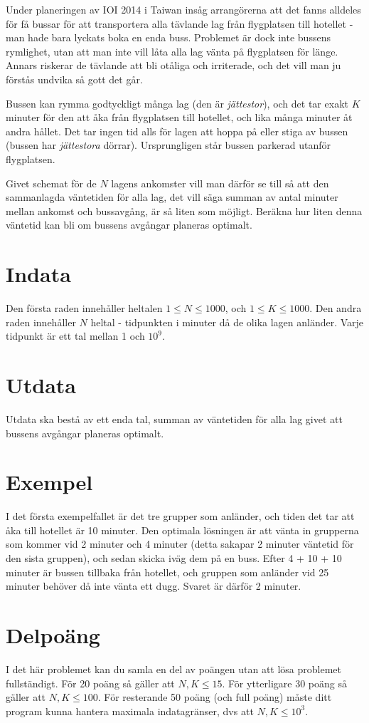 
Under planeringen av IOI 2014 i Taiwan insåg arrangörerna att det fanns alldeles för få bussar för att transportera alla tävlande lag från flygplatsen till hotellet - man hade bara lyckats boka en enda buss. Problemet är dock inte bussens rymlighet, utan att man inte vill låta alla lag vänta på flygplatsen för länge. Annars riskerar de tävlande att bli otåliga och irriterade, och det vill man ju förstås undvika så gott det går.

Bussen kan rymma godtyckligt många lag (den är \emph{jättestor}), och det tar exakt $K$ minuter för den att åka från flygplatsen till hotellet, och lika många minuter åt andra hållet. Det tar ingen tid alls för lagen att hoppa på eller stiga av bussen (bussen har \emph{jättestora} dörrar). Ursprungligen står bussen parkerad utanför flygplatsen.

Givet schemat för de $N$ lagens ankomster vill man därför se till så att den sammanlagda väntetiden för alla lag, det vill säga summan av antal minuter mellan ankomst och bussavgång, är så liten som möjligt. Beräkna hur liten denna väntetid kan bli om bussens avgångar planeras optimalt.

\section*{Indata}
Den första raden innehåller heltalen $1 \leq N \leq 1 000$, och $1 \leq K \leq 1000$.
Den andra raden innehåller $N$ heltal - tidpunkten i minuter då de olika lagen anländer. Varje tidpunkt är ett tal mellan 1 och $10^9$.

\section*{Utdata}
Utdata ska bestå av ett enda tal, summan av väntetiden för alla lag givet att bussens avgångar planeras optimalt.

\section*{Exempel}
I det första exempelfallet är det tre grupper som anländer, och tiden det tar att åka till hotellet är 10 minuter. Den optimala lösningen är att vänta in grupperna som kommer vid 2 minuter och 4 minuter (detta sakapar 2 minuter väntetid för den sista gruppen), och sedan skicka iväg dem på en buss. Efter 4 + 10 + 10 minuter är bussen tillbaka från hotellet, och gruppen som anländer vid 25 minuter behöver då inte vänta ett dugg. Svaret är därför 2 minuter.

\section*{Delpoäng}
I det här problemet kan du samla en del av poängen utan att lösa problemet fullständigt. För 20 poäng så gäller att $N, K \leq 15$. För ytterligare 30 poäng så gäller att $N,K \leq 100$. För resterande 50 poäng (och full poäng) måste ditt program kunna hantera maximala indatagränser, dvs att $N, K \leq 10^3$.
